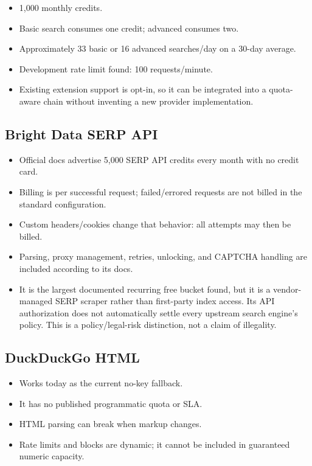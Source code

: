\documentclass[11pt]{article}
\begin{document}
\begin{itemize}
\item 1,000 monthly credits.
\item Basic search consumes one credit; advanced consumes two.
\item Approximately 33 basic or 16 advanced searches/day on a 30-day average.
\item Development rate limit found: 100 requests/minute.
\item Existing extension support is opt-in, so it can be integrated into a
quota-aware chain without inventing a new provider implementation.
\end{itemize}
\subsection*{Bright Data SERP API}
\label{sec:org25caddb}

\begin{itemize}
\item Official docs advertise 5,000 SERP API credits every month with no credit
card.
\item Billing is per successful request; failed/errored requests are not billed in
the standard configuration.
\item Custom headers/cookies change that behavior: all attempts may then be billed.
\item Parsing, proxy management, retries, unlocking, and CAPTCHA handling are
included according to its docs.
\item It is the largest documented recurring free bucket found, but it is a
vendor-managed SERP scraper rather than first-party index access.  Its API
authorization does not automatically settle every upstream search engine's
policy.  This is a policy/legal-risk distinction, not a claim of illegality.
\end{itemize}
\subsection*{DuckDuckGo HTML}
\label{sec:orgb6ec859}

\begin{itemize}
\item Works today as the current no-key fallback.
\item It has no published programmatic quota or SLA.
\item HTML parsing can break when markup changes.
\item Rate limits and blocks are dynamic; it cannot be included in guaranteed
numeric capacity.
\end{itemize}
\end{document}

